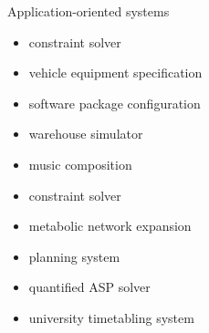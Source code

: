 \newcommand{\purpose}[1]{\hfill #1}
\begin{frame}[c]{Application-oriented systems}
  \begin{itemize}
  \item \aspartame\purpose{constraint solver}
  \item \aspcafe\purpose{vehicle equipment specification}
  \item \aspcud\purpose{software package configuration}
  \item \asprilo\purpose{warehouse simulator}
  \item \chasp\purpose{music composition}
  \item \flatzingo\purpose{constraint solver}
  \item \fluto\purpose{metabolic network expansion}
  \item \plasp\purpose{planning system}
  \item \qasp\purpose{quantified ASP solver}
  \item \teaspoon\purpose{university timetabling system}
  \end{itemize}
\end{frame}
%
